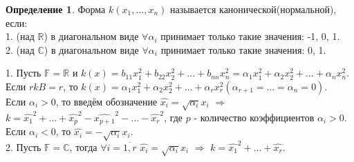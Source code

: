 \documentclass[a4paper, 12pt]{article}
\newcommand{\R}{\mathbb R}
\newcommand{\CC}{\mathbb C}
\newcommand{\F}{\mathbb F}
\theoremstyle{definition}
\newtheorem*{definition}{Определение}
\theoremstyle{plain}
\theoremstyle{remark}
\begin{document}
  \begin{definition}
    Форма $k(x_1,\ldots,x_n)$ называется канонической(нормальной), если:\\
    1. (над $\R$) в диагональном виде $\forall \alpha_i$ принимает только такие значения: -1, 0, 1.\\
    2. (над $\CC$) в диагональном виде $\forall \alpha_i$ принимает только такие значения: 0, 1.
  \end{definition}
  1. Пусть $\F=\R$ и $k(x)=b_{11}x_1^2+b_{22}x_2^2+\ldots+b_{nn}x_n^2 = \alpha_1x_1^2+\alpha_2x_2^2+\ldots+\alpha_nx_n^2$.\\ 
  Если $rkB=r$, то $k(x)=\alpha_1x_1^2+\alpha_2x_2^2+\ldots+\alpha_rx_r^2(\alpha_{r+1}=\ldots=\alpha_n=0)$.\\
  Если $\alpha_i>0$, то введём обозначение $\widehat{x_i}=\sqrt{\alpha_i}x_i$ $\Longrightarrow$ $k=\widehat{x_1}^2+\ldots+\widehat{x_p}^2-\widehat{x_{p+1}}^2-\ldots-\widehat{x_r}^2$, где $p$ - количество коэффициентов $\alpha_i>0$.\\
  Если $\alpha_i < 0$, то $\widehat{x_i} = -\sqrt{\alpha_i}x_i$.\\
  2. Пусть $\F=\CC$, тогда $\forall i=\overline{1,r}$ $\widehat{x_i}=\sqrt{\alpha_i}x_i$ $\Longrightarrow$ $k=\widehat{x_1}^2+\ldots+\widehat{x_r}$.
\end{document}
